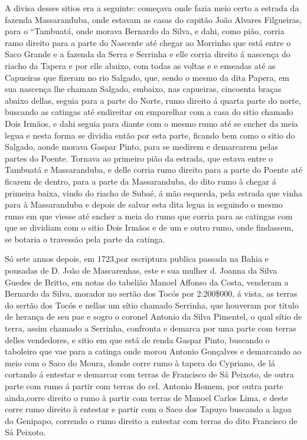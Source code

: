  A divisa desses sitios era a seguinte: começava
 onde fazia meio certo a estrada da fazenda Massaranduba,
 onde estavam as casas do capitão João Alvares Filgueiras, para o “Tambuatá, onde morava Bernardo da Silva, e dahi, como pião, corria ramo direito para a parte do Nascente até chegar ao Morrinho que está entre o Saco Grande e a fazenda da Serra e Serrinha e elle corria direito á nascença do riacho da Tapera
 e por elle abaixo, com todas as voltas e e enseadas até as Capueiras que fizeram no rio Salgado, que, sendo o mesmo da dita Papera, em sua nascença lhe chamam Salgado, embaixo, nas capueiras, cincoenta braças abaixo dellas, seguia para a parte do Norte, rumo direito á quarta parte do norte, buscando as
 catingas até endireitar ou emparelhar com a casa do sitio chamado Dois Irmãos, e dahi seguia para diante com o mesmo rumo até se encher da meia legua e nesta forma se dividia então por esta parte, ficando bem como o sitio do Salgado, aonde morava Gaspar Pinto, para se medirem e demarcarem pelas partes
 do Poente. Tornava ao primeiro pião da estrada, que estava entre o Tambuatá e Massaranduba, e delle corria rumo direito para a parte do Poente até ficarem de dentro, para a parte da Massaranduba, do dito rumo à chegar á primeira baixa, vindo do riacho de Subaé, á mão esquerda, pela estrada que vinha para à Massaranduba e depois de salvar esta dita legua ia seguindo o mesmo rumo em que viesse até encher a meia do rumo que corria para as catingas com que se dividiam com o sitio Dois Irmãos e de um e outro rumo, onde findassem, se botaria o travessão pela parte da catinga.
 
 Só sete annos depois, em 1723,por escriptura publica passada na Bahia e pousadas de D. João de Mascarenhas, este e sua mulher d. Joanna da Silva Guedes de Britto, em notas do tabelião Manoel Affonso da Costa, venderam a Bernardo da Silva, morador no sertão dos Tocós por 2:200\$000, á vista, as terras do sertão dos Tocós e nellas um sítio chamado Serrinha, que houveram por titulo de herança de seu pae e sogro o coronel Antonio da Silva Pimentel, o qual sítio de terra, assim chamado a Serrinha, confronta e demarca por uma parte com terras delles vendedores, e sitio em que está de renda Gaspar Pinto, buscando o taboleiro que vae para a catinga onde morou Antonio Gonçalves e demarcando ao meio com o Saco do Moura, donde corre rumo à tapera do Cypriano, de lá cortando á entestar e demarcar com terras de Francisco de Sá Peixoto, de outra parte com rumo á partir com terras do cel. Antonio Homem, por outra parte ainda,corre direito o rumo à partir com terras de Manoel Carlos Lima, e deste corre rumo direito à entestar e partir com o Saco dos Tapuyo buscando a lagoa do Genipapo, correndo o rumo
 direito a entestar com terras do dito Francisco
 de Sá Peixoto.
 
